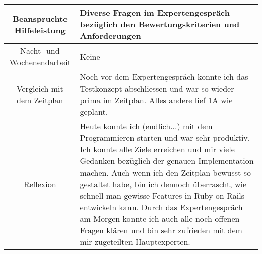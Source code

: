 \begin{tabularx}{\textwidth}[H]{|c|X|}
    Beanspruchte Hilfeleistung &
    Diverse Fragen im Expertengespräch bezüglich den Bewertungskriterien und Anforderungen
    \\ \hline

    Nacht- und Wochenendarbeit &
    Keine
    \\ \hline

    Vergleich mit dem Zeitplan &
    Noch vor dem Expertengespräch konnte ich das Testkonzept abschliessen und war so wieder prima im
    Zeitplan. Alles andere lief 1A wie geplant.
    \\ \hline

    Reflexion                  &
    Heute konnte ich (endlich...) mit dem Programmieren starten und war sehr produktiv. Ich konnte
    alle Ziele erreichen und mir viele Gedanken bezüglich der genauen Implementation machen.
    Auch wenn ich den Zeitplan bewusst so gestaltet habe, bin ich dennoch überrascht, wie schnell man
    gewisse Features in Ruby on Rails entwickeln kann. Durch das Expertengespräch am Morgen konnte ich auch alle noch offenen Fragen klären
    und bin sehr zufrieden mit dem mir zugeteilten Hauptexperten.
    \\ \hline
\end{tabularx}
